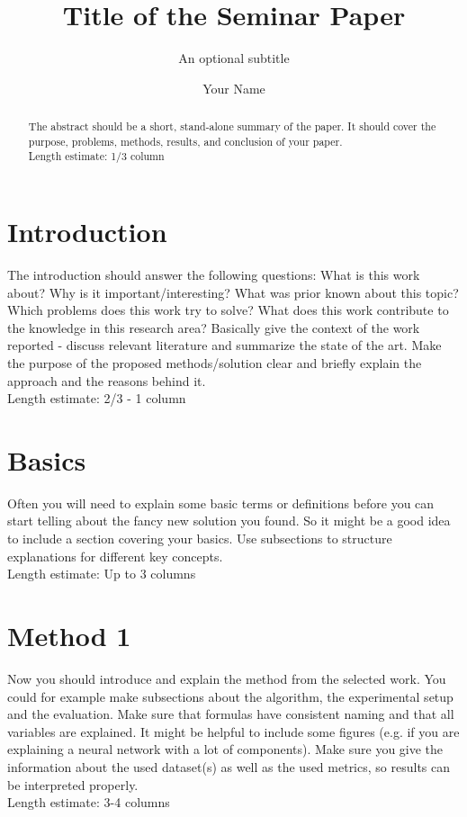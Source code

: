 \documentclass[sigconf,natbib=false]{acmart}
\begin{document}

\title{Title of the Seminar Paper}
\subtitle{An optional subtitle}

\author{Your Name}


\begin{abstract}
The abstract should be a short, stand-alone summary of the paper.
It should cover the purpose, problems, methods, results, and conclusion
of your paper.\\
Length estimate:  1/3  column
\end{abstract}



\maketitle

\section{Introduction}
The introduction should answer the following questions:
What is this work about? Why is it important/interesting? What
was prior known about this topic? Which problems does this work
try to solve? What does this work contribute to the knowledge in
this research area?
Basically give the context of the work reported - discuss relevant
literature and summarize the state of the art. Make the purpose
of the proposed methods/solution clear and briefly explain the
approach and the reasons behind it.\\
Length estimate:  2/3 - 1 column

\section{Basics}
Often you will need to explain some basic terms or definitions
before you can start telling about the fancy new solution you found.
So it might be a good idea to include a section covering your basics.
Use subsections to structure explanations for different key concepts.\\
Length estimate: Up to 3 columns

\section{Method 1}
Now you should introduce and explain the method from the selected work. You could for example make subsections about the algorithm, the experimental setup and the evaluation. 
Make sure that formulas have consistent naming and that all variables
are explained. It might be helpful to include some figures (e.g.
if you are explaining a neural network with a lot of components).
Make sure you give the information about the used dataset(s) as well as the used metrics, so results can be interpreted properly.\\
Length estimate: 3-4 columns
\end{document}
